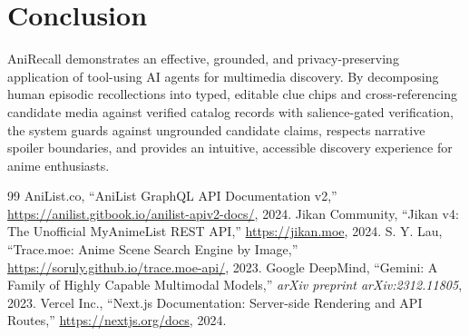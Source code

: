 \documentclass[11pt,a4paper]{article}
\begin{document}
\section{Conclusion}
\label{sec:conclusion}

AniRecall demonstrates an effective, grounded, and privacy-preserving application of tool-using AI agents for multimedia discovery. By decomposing human episodic recollections into typed, editable clue chips and cross-referencing candidate media against verified catalog records with salience-gated verification, the system guards against ungrounded candidate claims, respects narrative spoiler boundaries, and provides an intuitive, accessible discovery experience for anime enthusiasts.

\begin{thebibliography}{99}
 AniList.co, ``AniList GraphQL API Documentation v2,'' \url{https://anilist.gitbook.io/anilist-apiv2-docs/}, 2024.
 Jikan Community, ``Jikan v4: The Unofficial MyAnimeList REST API,'' \url{https://jikan.moe}, 2024.
 S. Y. Lau, ``Trace.moe: Anime Scene Search Engine by Image,'' \url{https://soruly.github.io/trace.moe-api/}, 2023.
 Google DeepMind, ``Gemini: A Family of Highly Capable Multimodal Models,'' \textit{arXiv preprint arXiv:2312.11805}, 2023.
 Vercel Inc., ``Next.js Documentation: Server-side Rendering and API Routes,'' \url{https://nextjs.org/docs}, 2024.
\end{thebibliography}
\end{document}
